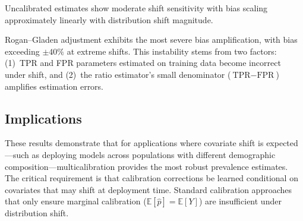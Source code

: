 \documentclass[12pt]{article}
\begin{document}
Uncalibrated estimates show moderate shift sensitivity with bias scaling
approximately linearly with distribution shift magnitude.

Rogan--Gladen adjustment exhibits the most severe bias amplification, with
bias exceeding $\pm 40\%$ at extreme shifts. This instability stems from
two factors: (1)~TPR and FPR parameters estimated on training data become
incorrect under shift, and (2)~the ratio estimator's small denominator
($\text{TPR} - \text{FPR}$) amplifies estimation errors.

\subsection{Implications}

These results demonstrate that for applications where covariate shift is
expected---such as deploying models across populations with different
demographic composition---multicalibration provides the most robust
prevalence estimates. The critical requirement is that calibration
corrections be learned conditional on covariates that may shift at
deployment time. Standard calibration approaches that only ensure marginal
calibration ($\mathbb{E}[\hat{p}] = \mathbb{E}[Y]$) are insufficient
under distribution shift.
\end{document}
